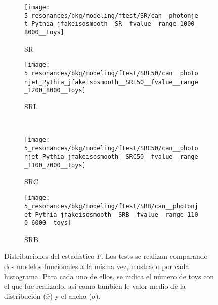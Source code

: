 \begin{figure}[ht!]
    \centering
    \begin{subfigure}[h]{0.49\linewidth}
        \centering
        \texttt{[image: 5\_resonances/bkg/modeling/ftest/SR/can\_\_photonjet\_Pythia\_jfakeisosmooth\_\_SR\_\_fvalue\_\_range\_1000\_8000\_\_toys]}
        \caption{SR}
    \end{subfigure}
    \begin{subfigure}[h]{0.49\linewidth}
        \centering
        \texttt{[image: 5\_resonances/bkg/modeling/ftest/SRL50/can\_\_photonjet\_Pythia\_jfakeisosmooth\_\_SRL50\_\_fvalue\_\_range\_1200\_8000\_\_toys]}
        \caption{SRL}
    \end{subfigure}
    \\
    \begin{subfigure}[h]{0.49\linewidth}
        \centering
        \texttt{[image: 5\_resonances/bkg/modeling/ftest/SRC50/can\_\_photonjet\_Pythia\_jfakeisosmooth\_\_SRC50\_\_fvalue\_\_range\_1100\_7000\_\_toys]}
        \caption{SRC}
    \end{subfigure}
    \begin{subfigure}[h]{0.49\linewidth}
        \centering
        \texttt{[image: 5\_resonances/bkg/modeling/ftest/SRB/can\_\_photonjet\_Pythia\_jfakeisosmooth\_\_SRB\_\_fvalue\_\_range\_1100\_6000\_\_toys]}
        \caption{SRB}
    \end{subfigure}
    \caption{Distribuciones del estadístico \(F\). Los tests se realizan comparando dos modelos funcionales a la misma vez, mostrado por cada histograma. Para cada uno de ellos, se indica el número de toys con el que fue realizado, así como también le valor medio de la distribución (\(\bar{x}\)) y el ancho (\(\sigma\)).}
    \label{fig:bkg:modeling:preparation:ftest:ftest}
\end{figure}

